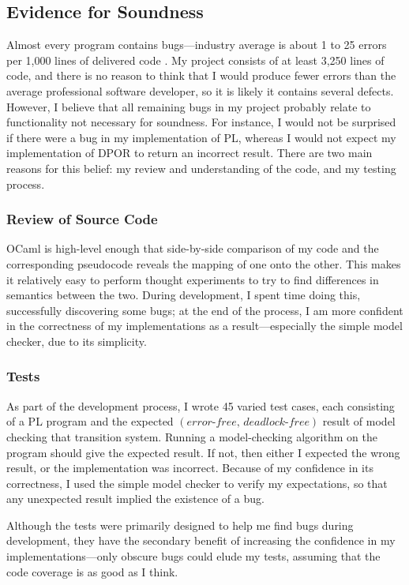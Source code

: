 \documentclass[12pt,a4paper,twoside,openany]{report}
\begin{document}
\subsection{Evidence for Soundness}
Almost every program contains bugs---industry average
is about 1 to 25 errors per 1,000 lines
of delivered code \cite{mccon04}.
My project consists of
at least 3,250 lines of code,
and there is no reason to think that I would
produce fewer errors than the average
professional software developer, so
it is likely it contains several defects.
However, I believe that
all remaining bugs in my project
probably relate
to functionality not necessary for
soundness. For instance, I would
not be surprised if there were a bug
in my implementation of PL,
whereas I would not expect
my implementation of DPOR to
return an incorrect result.
There are two main reasons
for this belief: my review and understanding
of the code, and my testing process.

\subsubsection{Review of Source Code}
OCaml is high-level enough that 
side-by-side comparison of my code
and the corresponding pseudocode reveals
the mapping of one onto the other. This
makes it relatively easy to perform
thought experiments to try to find
differences in semantics between the two.
During development, I spent time doing this,
successfully discovering some bugs; at
the end of the process, I am more
confident in the correctness of my implementations
as a result---especially
the simple model checker,
due to its simplicity.

\subsubsection{Tests}
\label{sec:pl-checker-tests}
As part of the development process,
I wrote 45 varied test cases, each
consisting of a PL program and
the expected
$(\textit{error-free},\, \textit{deadlock-free})$
result of model checking that transition
system.
Running a
model-checking algorithm on the
program should give the expected
result. If not, then either
I expected the wrong result,
or the implementation was incorrect.
Because of my confidence in its
correctness, I used the simple
model checker to verify
my expectations, so that any
unexpected result implied the
existence of a bug.

Although the tests were primarily designed
to help me find bugs during
development, they have the
secondary benefit of increasing the
confidence in my implementations---only
obscure bugs could
elude my tests, assuming that the
code coverage is as good as I think.
\end{document}
